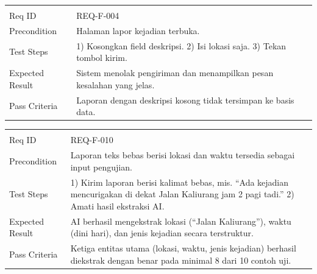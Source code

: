\documentclass[11pt,a4paper]{article}
\begin{document}
\begin{longtable}{|L{2.6cm}|L{11.4cm}|}
\hline
{} \\ \hline
\endfirsthead
\hline
{} \\ \hline
\endhead
Req ID & REQ-F-004 \\ \hline
Precondition & Halaman lapor kejadian terbuka. \\ \hline
Test Steps & 1) Kosongkan field deskripsi. 2) Isi lokasi saja. 3) Tekan tombol kirim. \\ \hline
Expected Result & Sistem menolak pengiriman dan menampilkan pesan kesalahan yang jelas. \\ \hline
Pass Criteria & Laporan dengan deskripsi kosong tidak tersimpan ke basis data. \\ \hline
\end{longtable}

\begin{longtable}{|L{2.6cm}|L{11.4cm}|}
\hline
{} \\ \hline
\endfirsthead
\hline
{} \\ \hline
\endhead
Req ID & REQ-F-010 \\ \hline
Precondition & Laporan teks bebas berisi lokasi dan waktu tersedia sebagai input pengujian. \\ \hline
Test Steps & 1) Kirim laporan berisi kalimat bebas, mis. ``Ada kejadian mencurigakan di dekat Jalan Kaliurang jam 2 pagi tadi.'' 2) Amati hasil ekstraksi AI. \\ \hline
Expected Result & AI berhasil mengekstrak lokasi (``Jalan Kaliurang''), waktu (dini hari), dan jenis kejadian secara terstruktur. \\ \hline
Pass Criteria & Ketiga entitas utama (lokasi, waktu, jenis kejadian) berhasil diekstrak dengan benar pada minimal 8 dari 10 contoh uji. \\ \hline
\end{longtable}
\end{document}
